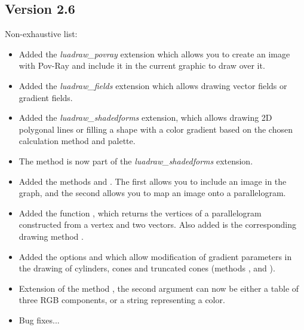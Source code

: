 \subsection{Version 2.6}
Non-exhaustive list:
\begin{itemize}
    \item Added the \emph{luadraw\_povray} extension which allows you to create an image with Pov-Ray and include it in the current graphic to draw over it.
    \item Added the \emph{luadraw\_fields} extension which allows drawing vector fields or gradient fields.
    \item Added the \emph{luadraw\_shadedforms} extension, which allows drawing 2D polygonal lines or filling a shape with a color gradient based on the chosen calculation method and palette.
    \item The  method is now part of the \emph{luadraw\_shadedforms} extension.    
    \item Added the methods  and . The first allows you to include an image in the graph, and the second allows you to map an image onto a parallelogram.
    \item Added the function , which returns the vertices of a parallelogram constructed from a vertex and two vectors. Also added is the corresponding drawing method .
    \item Added the options  and  which allow modification of gradient parameters in the drawing of cylinders, cones and truncated cones (methods ,  and ).
    \item Extension of the method , the second argument can now be either a table of three RGB components, or a string representing a color.
    \item Bug fixes...
\end{itemize}

